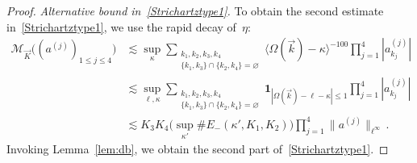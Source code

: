 \documentclass[11pt,reqno,english]{amsart}
\numberwithin{equation}{section}
\theoremstyle{plain}
\theoremstyle{definition}
\theoremstyle{remark}
\begin{document}
\begin{proof}
	\emph{Alternative bound in~\eqref{Strichartztype1}.}
	To obtain the second estimate in~\eqref{Strichartztype1}, we use the rapid decay of~$\eta$:
	\begin{align*}
		\mathcal{M}_{\vec{K}}\big((a^{(j)})_{1\le j\le 4}\big)
		&\lesssim
		\sup_{\kappa}
		\sum_{\substack{k_{1},k_{2},k_{3},k_{4}\\
				\{k_{1},k_{3}\}\cap\{k_{2},k_{4}\}=\varnothing}}
		\langle\Omega(\vec k)-\kappa\rangle^{-100}
		\prod_{j=1}^4 |a_{k_j}^{(j)}|
		\\
		&\lesssim
		\sup_{\ell,\kappa}
		\sum_{\substack{k_{1},k_{2},k_{3},k_{4}\\
				\{k_{1},k_{3}\}\cap\{k_{2},k_{4}\}=\varnothing}}
		\mathbf{1}_{|\Omega(\vec k)-\ell-\kappa|\le 1}
		\prod_{j=1}^4 |a_{k_j}^{(j)}|
		\\
		&\lesssim
		K_3K_4
		\Big(
		\sup_{\kappa'}\#E_{-}(\kappa',K_1,K_2)
		\Big)
		\prod_{j=1}^4\|a^{(j)}\|_{\ell^\infty}\,.
	\end{align*}
	Invoking Lemma~\ref{lem:db}, we obtain the second part of~\eqref{Strichartztype1}.


\end{proof}
\end{document}
